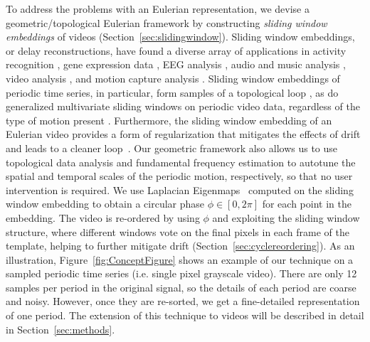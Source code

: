 \documentclass{article}
\begin{document}
To address the problems with an Eulerian representation, we devise a geometric/topological Eulerian framework by constructing {\em sliding window embeddings} of videos (Section~\ref{sec:slidingwindow}).  Sliding window embeddings, or delay reconstructions, have found a diverse array of applications in activity recognition \cite{frank2010activity,venkataraman2016shape}, gene expression data \cite{perea2015sw1pers}, EEG analysis \cite{stam2005nonlinear, plesnik2014detection}, audio and music analysis \cite{herzel1994analysis,serra2009cross,bello2011measuring,traliemoebius}, video analysis \cite{tralie2017quasi}, and motion capture analysis \cite{venkataraman2016shape}.  Sliding window embeddings of periodic time series, in particular, form samples of a topological loop \cite{perea2015sliding}, as do generalized multivariate sliding windows on periodic video data, regardless of the type of motion present \cite{traliehigh, tralie2017quasi}.  Furthermore, the sliding window embedding of an Eulerian video provides a form of regularization that mitigates the effects of drift and leads to a cleaner loop~\cite{tralie2017quasi}.  Our geometric framework also allows us to use topological data analysis \cite{edelsbrunner2000topological,edelsbrunner2008persistent,edelsbrunner2010computational,carlsson2009topology,ghrist2014elementary} and fundamental frequency estimation \cite{Mcleod05asmarter} to autotune the spatial and temporal scales of the periodic motion, respectively, so that no user intervention is required.  We use Laplacian Eigenmaps~\cite{belkin2003laplacian} computed on the sliding window embedding to obtain a circular phase $\phi \in [0, 2\pi]$ for each point in the embedding.  The video is re-ordered by using $\phi$ and exploiting the sliding window structure, where different windows vote on the final pixels in each frame of the template, helping to further mitigate drift (Section~\ref{sec:cyclereordering}).  As an illustration, Figure~\ref{fig:ConceptFigure} shows an example of our technique on a sampled periodic time series (i.e. single pixel grayscale video).  There are only 12 samples per period in the original signal, so the details of each period are coarse and noisy.  However, once they are re-sorted, we get a fine-detailed representation of one period.  The extension of this technique to videos will be described in detail in Section~\ref{sec:methods}.
\end{document}
